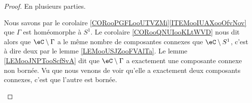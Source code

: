 \begin{proof}
	En plusieurs parties.
	\begin{subproof}
		Nous savons par le corolaire \ref{CORooPGFLooUTVZMi}\ref{ITEMooIUAXooOfvNov} que \( \Gamma\) est homéomorphe à \( S^1\). Le corolaire \ref{CORooQNUIooKLtWVD} nous dit alors que \( \eC\setminus \Gamma\) a le même nombre de composantes connexes que \( \eC\setminus S^1\), c'est à dire deux par le lemme \ref{LEMooUSJZooFVAlTa}.
		Le lemme \ref{LEMooJNPTooScfSvA} dit que \( \eC\setminus \Gamma\) a exactement une composante connexe non bornée. Vu que nous venons de voir qu'elle a exactement deux composants connexes, c'est que l'autre est bornée.
	\end{subproof}
\end{proof}
